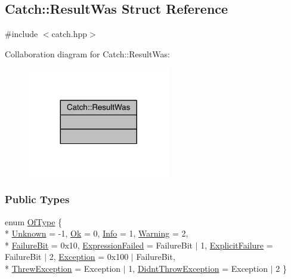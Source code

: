 \hypertarget{a00069}{}\subsection{Catch\+:\+:Result\+Was Struct Reference}
\label{a00069}


{\ttfamily \#include $<$catch.\+hpp$>$}



Collaboration diagram for Catch\+:\+:Result\+Was\+:\nopagebreak
\begin{figure}[H]
\begin{center}
\leavevmode
\includegraphics[width=176pt]{a00255}
\end{center}
\end{figure}
\subsubsection*{Public Types}
\begin{DoxyCompactItemize}
\item 
enum \hyperlink{a00069_a624e1ee3661fcf6094ceef1f654601ef}{Of\+Type} \{ \\*
\hyperlink{a00069_a624e1ee3661fcf6094ceef1f654601efa65721dda02fe5efb522e7449e496608a}{Unknown} = -\/1, 
\hyperlink{a00069_a624e1ee3661fcf6094ceef1f654601efae7cbe89bb9ec7ece9b44d48b63d01b63}{Ok} = 0, 
\hyperlink{a00069_a624e1ee3661fcf6094ceef1f654601efa30222063929ca1b6318faa78e8242f1c}{Info} = 1, 
\hyperlink{a00069_a624e1ee3661fcf6094ceef1f654601efa67e9d36ba0f04a60a19896834d840c21}{Warning} = 2, 
\\*
\hyperlink{a00069_a624e1ee3661fcf6094ceef1f654601efa1818f1b198f10b5734c405142b22025c}{Failure\+Bit} = 0x10, 
\hyperlink{a00069_a624e1ee3661fcf6094ceef1f654601efa5e7126b8458dc1376ac870a719f7873f}{Expression\+Failed} = Failure\+Bit $\vert$ 1, 
\hyperlink{a00069_a624e1ee3661fcf6094ceef1f654601efacecfc052e2499499b13304249303cc36}{Explicit\+Failure} = Failure\+Bit $\vert$ 2, 
\hyperlink{a00069_a624e1ee3661fcf6094ceef1f654601efaa9107b7836cc7590ca668002f76d27c7}{Exception} = 0x100 $\vert$ Failure\+Bit, 
\\*
\hyperlink{a00069_a624e1ee3661fcf6094ceef1f654601efa3bb56296483947280cf7fa1ad074ab45}{Threw\+Exception} = Exception $\vert$ 1, 
\hyperlink{a00069_a624e1ee3661fcf6094ceef1f654601efa8b6d3d5bc78d4e7a95543b6ecfbdb57d}{Didnt\+Throw\+Exception} = Exception $\vert$ 2
 \}
\end{DoxyCompactItemize}


